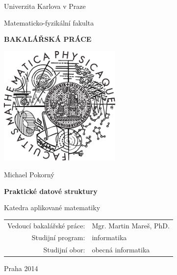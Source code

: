 \pagestyle{empty}
\begin{center}

\large

Univerzita Karlova v Praze

\medskip

Matematicko-fyzikální fakulta

\vfill

{\bf\Large BAKALÁŘSKÁ PRÁCE}

\vfill

\centerline{\mbox{\includegraphics[width=60mm]{img/logo.eps}}}

\vfill
\vspace{5mm}

{\LARGE Michael Pokorný}

\vspace{15mm}

{\LARGE\bfseries Praktické datové struktury}

\vfill

Katedra aplikované matematiky

\vfill

\begin{tabular}{rl}

Vedoucí bakalářské práce: & Mgr. Martin Mareš, PhD.\\
\noalign{\vspace{2mm}}
Studijní program: & informatika \\
\noalign{\vspace{2mm}}
Studijní obor: & obecná informatika \\
\end{tabular}

\vfill

Praha 2014

\end{center}
